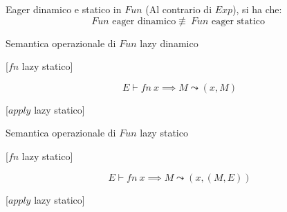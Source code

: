 \documentclass[a4paper,11pt]{report}
\begin{document}
\begin{lemmabox}{Eager dinamico e statico in \( Fun \)}{}
    (Al contrario di \( Exp \)), si ha che:
    \[ Fun \text{ eager dinamico} \not\equiv \ Fun \text{ eager statico } \]
\end{lemmabox}

\begin{prooftree}
\end{prooftree}

\begin{defbox}{Semantica operazionale di \( Fun \) lazy dinamico}{}

    \begin{center}
        [\( fn \) lazy statico]
    \end{center}
    \vspace{-1em}
    \[ E \vdash fn \ x \implies M \leadsto (x, M) \]


    \begin{center}
        [\( apply \) lazy statico]
    \end{center}
    \vspace{-2em}
    \begin{prooftree}
    \end{prooftree}
\end{defbox}
\begin{defbox}{Semantica operazionale di \( Fun \) lazy statico}{}

    \begin{center}
        [\( fn \) lazy statico]
    \end{center}
    \vspace{-1em}
    \[ E \vdash fn \ x \implies M \leadsto (x, (M, E)) \]


    \begin{center}
        [\( apply \) lazy statico]
    \end{center}
    \vspace{-2em}
    \begin{prooftree}
    \end{prooftree}
\end{defbox}
\end{document}
